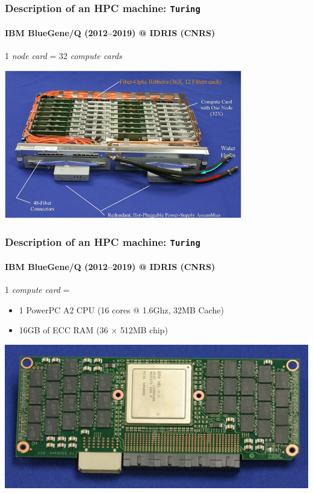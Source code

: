 \documentclass[xcolor={x11names,svgnames,psnames}]{beamer}
\begin{document}
\begin{frame}
    \frametitle{Description of an HPC machine: \texttt{Turing}}
  \framesubtitle{IBM BlueGene/Q (2012--2019) @ IDRIS (CNRS)}
  
  1 \textit{node card} = 32 \textit{compute cards}
  
  \begin{center}
    \includegraphics[height=6.5cm]{bgqNodeCard}
  \end{center}
\end{frame}


\begin{frame}
    \frametitle{Description of an HPC machine: \texttt{Turing}}
  \framesubtitle{IBM BlueGene/Q (2012--2019) @ IDRIS (CNRS)}
  
  1 \textit{compute card} =
  \begin{itemize}
  \item 1 PowerPC A2 CPU (16 cores @ 1.6Ghz, 32MB Cache)
  \item 16GB of ECC RAM (36 $\times$ 512MB chip)
  \end{itemize}

  \begin{center}
    \includegraphics[width=\textwidth]{bgqComputeCard}
  \end{center}
\end{frame}
\end{document}
